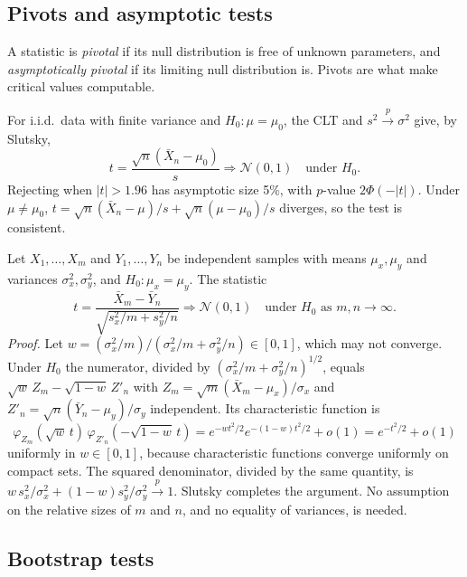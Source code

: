 \documentclass[11pt,a4paper]{article}
\newcommand{\N}{\mathcal{N}}
\newcommand{\cp}{\xrightarrow{\;p\;}}
\newcommand{\cd}{\Rightarrow}
\newcommand{\iid}{i.i.d.}
\newcommand{\Xbar}{\bar X_n}
\begin{document}
\subsection{Pivots and asymptotic tests}

A statistic is \emph{pivotal} if its null distribution is free of unknown parameters, and \emph{asymptotically pivotal} if its limiting null distribution is. Pivots are what make critical values computable.

\begin{example}\label{ex:ttest}
For \iid\ data with finite variance and $H_0:\mu=\mu_0$, the CLT and $s^2\cp\sigma^2$ give, by Slutsky,
\[
t=\frac{\sqrt n(\Xbar-\mu_0)}{s}\cd\N(0,1)\quad\text{under }H_0 .
\]
Rejecting when $|t|>1.96$ has asymptotic size 5\%, with $p$-value $2\Phi(-|t|)$. Under $\mu\ne\mu_0$, $t=\sqrt n(\Xbar-\mu)/s+\sqrt n(\mu-\mu_0)/s$ diverges, so the test is consistent.
\end{example}

\begin{example}
Let $X_1,\ldots,X_m$ and $Y_1,\ldots,Y_n$ be independent samples with means $\mu_x,\mu_y$ and variances $\sigma_x^2,\sigma_y^2$, and $H_0:\mu_x=\mu_y$. The statistic
\[
t=\frac{\bar X_m-\bar Y_n}{\sqrt{s_x^2/m+s_y^2/n}}\cd\N(0,1)\quad\text{under }H_0\text{ as }m,n\to\infty .
\]
\emph{Proof.} Let $w=(\sigma_x^2/m)/(\sigma_x^2/m+\sigma_y^2/n)\in[0,1]$, which may not converge. Under $H_0$ the numerator, divided by $(\sigma_x^2/m+\sigma_y^2/n)^{1/2}$, equals $\sqrt w\,Z_m-\sqrt{1-w}\,Z'_n$ with $Z_m=\sqrt m(\bar X_m-\mu_x)/\sigma_x$ and $Z'_n=\sqrt n(\bar Y_n-\mu_y)/\sigma_y$ independent. Its characteristic function is
\[
\varphi_{Z_m}(\sqrt w\,t)\,\varphi_{Z'_n}(-\sqrt{1-w}\,t)=e^{-wt^2/2}e^{-(1-w)t^2/2}+o(1)=e^{-t^2/2}+o(1)
\]
uniformly in $w\in[0,1]$, because characteristic functions converge uniformly on compact sets. The squared denominator, divided by the same quantity, is $w\,s_x^2/\sigma_x^2+(1-w)s_y^2/\sigma_y^2\cp1$. Slutsky completes the argument. No assumption on the relative sizes of $m$ and $n$, and no equality of variances, is needed.
\end{example}

\subsection{Bootstrap tests}\label{sec:boottest}
\end{document}

